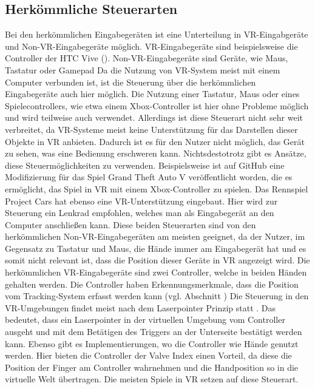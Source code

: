 \subsection{Herkömmliche Steuerarten}
Bei den herkömmlichen Eingabegeräten ist eine Unterteilung in VR-Eingabgeräte und Non-VR-Eingabegeräte möglich. VR-Eingabegeräte sind beispielsweise die Controller der HTC Vive (). Non-VR-Eingabegeräte sind Geräte, wie Maus, Tastatur oder Gamepad
Da die Nutzung von VR-System meist mit einem Computer verbunden ist, ist die Steuerung über die herkömmlichen Eingabegeräte auch hier möglich. Die Nutzung einer Tastatur, Maus oder eines Spielecontrollers, wie etwa einem Xbox-Controller ist hier ohne Probleme möglich und wird teilweise auch verwendet. Allerdings ist diese Steuerart nicht sehr weit verbreitet, da VR-Systeme meist keine Unterstützung für das Darstellen dieser Objekte in VR anbieten. Dadurch ist es für den Nutzer nicht möglich, das Gerät zu sehen, was eine Bedienung erschweren kann. Nichtsdestotrotz gibt es Ansätze, diese Steuermöglichkeiten zu verwenden. Beispielsweise ist auf GitHub eine Modifizierung für das Spiel Grand Theft Auto V veröffentlicht worden, die es ermöglicht, das Spiel in VR mit einem Xbox-Controller zu spielen\cite{Werner.2020}. Das Rennspiel Project Cars hat ebenso eine VR-Unterstützung eingebaut. Hier wird zur Steuerung ein Lenkrad empfohlen, welches man als Eingabegerät an den Computer anschließen kann\cite{projCars}. Diese beiden Steuerarten sind von den herkömmlichen Non-VR-Eingabegeräten am meisten geeignet, da der Nutzer, im Gegensatz zu Tastatur und Maus, die Hände immer am Eingabegerät hat und es somit nicht relevant ist, dass die Position dieser Geräte in VR angezeigt wird. 
Die herkömmlichen VR-Eingabegeräte sind zwei Controller, welche in beiden Händen gehalten werden. Die Controller haben Erkennungsmerkmale, dass die Position vom Tracking-System erfasst werden kann (vgl. Abschnitt ) Die Steuerung in den VR-Umgebungen findet meist nach dem Laserpointer Prinzip statt . Das bedeutet, dass ein Laserpointer in der virtuellen Umgebung vom Controller ausgeht und mit dem Betätigen des Triggers an der Unterseite bestätigt werden kann. Ebenso gibt es Implementierungen, wo die Controller wie Hände genutzt werden. Hier bieten die Controller der Valve Index einen Vorteil, da diese die Position der Finger am Controller wahrnehmen und die Handposition so in die virtuelle Welt übertragen\cite{Index.Controller}. Die meisten Spiele in VR setzen auf diese Steuerart.

